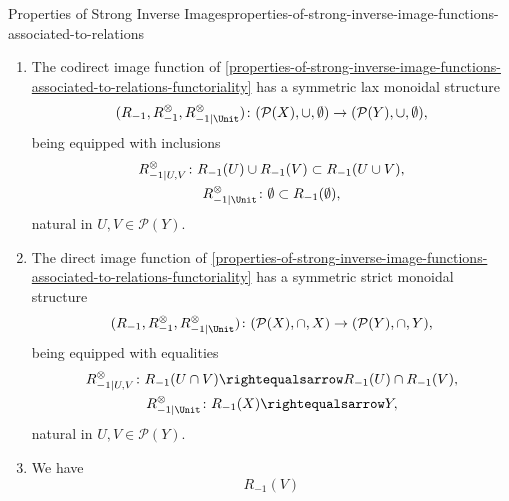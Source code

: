 \begin{proposition}{Properties of Strong Inverse Images}{properties-of-strong-inverse-image-functions-associated-to-relations}
\begin{enumerate}
            natural in $U,V\in\mathcal{P}(Y)$.
        \item\label{properties-of-strong-inverse-image-functions-associated-to-relations-symmetric-lax-monoidality-with-respect-to-unions}The codirect image function of \cref{properties-of-strong-inverse-image-functions-associated-to-relations-functoriality} has a symmetric lax monoidal structure
            \[
                (R_{-1},R^{\otimes}_{-1},R^{\otimes}_{-1|\Unit})
                \colon
                (\mathcal{P}(X),\cup,\emptyset)
                \to
                (\mathcal{P}(Y),\cup,\emptyset),
            \]%
            being equipped with inclusions%
            \[
                \begin{gathered}
                    R^{\otimes}_{-1|U,V}   \colon R_{-1}(U)\cup R_{-1}(V) \subset R_{-1}(U\cup V),\\
                    R^{\otimes}_{-1|\Unit} \colon \emptyset               \subset R_{-1}(\emptyset),
                \end{gathered}
            \]%
            natural in $U,V\in\mathcal{P}(Y)$.
        \item\label{properties-of-strong-inverse-image-functions-associated-to-relations-symmetric-strict-monoidality-with-respect-to-intersections}The direct image function of \cref{properties-of-strong-inverse-image-functions-associated-to-relations-functoriality} has a symmetric strict monoidal structure
            \[
                (R_{-1},R^{\otimes}_{-1},R^{\otimes}_{-1|\Unit})
                \colon
                (\mathcal{P}(X),\cap,X)
                \to
                (\mathcal{P}(Y),\cap,Y),
            \]%
            being equipped with equalities%
            \[
                \begin{gathered}
                    R^{\otimes}_{-1|U,V}   \colon R_{-1}(U\cap V) \rightequalsarrow R_{-1}(U)\cap R_{-1}(V),\\
                    R^{\otimes}_{-1|\Unit} \colon R_{-1}(X)       \rightequalsarrow Y,
                \end{gathered}
            \]%
            natural in $U,V\in\mathcal{P}(Y)$.
        \item\label{properties-of-strong-inverse-image-functions-associated-to-relations-interaction-with-weak-inverse-images-1}We have
            \[
                R_{-1}(V)%
\]
\end{enumerate}
\end{proposition}
